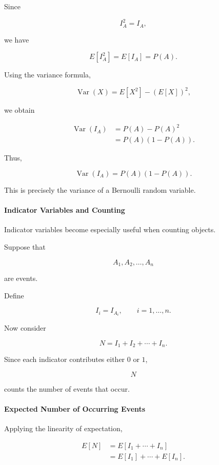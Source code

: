 \documentclass[11pt]{article}
\begin{document}
\begin{mdframed}[
		linewidth=0.8pt,
		roundcorner=6pt,
		backgroundcolor=gray!5,
		linecolor=gray!60,
		innertopmargin=10pt,
		innerbottommargin=10pt,
		innerleftmargin=10pt,
		innerrightmargin=10pt
		]
		Since
		
		\[
		I_A^2=I_A,
		\]
		
		we have
		
		\[
		E[I_A^2]
		=
		E[I_A]
		=
		P(A).
		\]
		
		Using the variance formula,
		
		\[
		\operatorname{Var}(X)
		=
		E[X^2]-(E[X])^2,
		\]
		
		we obtain
		
		\[
		\begin{aligned}
			\operatorname{Var}(I_A)
			&=
			P(A)-P(A)^2
			\\[0.3cm]
			&=
			P(A)(1-P(A)).
		\end{aligned}
		\]
		
		Thus,
		
		\[
		\boxed{
			\operatorname{Var}(I_A)
			=
			P(A)(1-P(A)).
		}
		\]
		
		This is precisely the variance of a Bernoulli random variable.
		
		\bigskip
		
		\paragraph{Indicator Variables and Counting}
		
		Indicator variables become especially useful when counting objects.
		
		Suppose that
		
		\[
		A_1,A_2,\ldots,A_n
		\]
		
		are events.
		
		Define
		
		\[
		I_i=
		I_{A_i},
		\qquad
		i=1,\ldots,n.
		\]
		
		Now consider
		
		\[
		N
		=
		I_1+I_2+\cdots+I_n.
		\]
		
		Since each indicator contributes either \(0\) or \(1\),
		
		\[
		N
		\]
		
		counts the number of events that occur.
		
		\bigskip
		
		\paragraph{Expected Number of Occurring Events}
		
		Applying the linearity of expectation,
		
		\[
		\begin{aligned}
			E[N]
			&=
			E[I_1+\cdots+I_n]
			\\[0.3cm]
			&=
			E[I_1]+\cdots+E[I_n].
		\end{aligned}
		\]
		

\end{mdframed}
\end{document}
